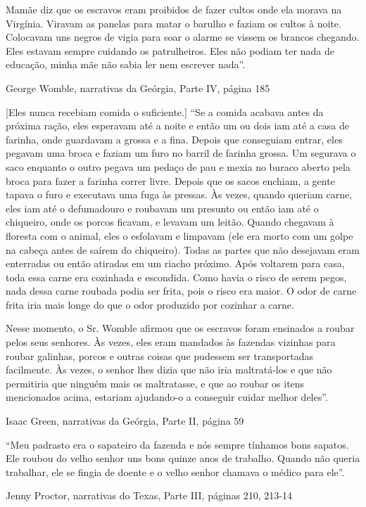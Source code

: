 Mamãe diz que os escravos eram proibidos de fazer cultos onde ela morava
na Virgínia. Viravam as panelas para matar o barulho e faziam os cultos
à noite. Colocavam uns negros de vigia para soar o alarme se vissem os
brancos chegando. Eles estavam sempre cuidando os patrulheiros. Eles não
podiam ter nada de educação, minha mãe não sabia ler nem escrever
nada''.

George Womble, narrativas da Geórgia, Parte IV, página 185

{[}Eles nunca recebiam comida o suficiente.{]} ``Se a comida acabava
antes da próxima ração, eles esperavam até a noite e então um ou dois
iam até a casa de farinha, onde guardavam a grossa e a fina. Depois que
conseguiam entrar, eles pegavam uma broca e faziam um furo no barril de
farinha grossa. Um segurava o saco enquanto o outro pegava um pedaço de
pau e mexia no buraco aberto pela broca para fazer a farinha correr
livre. Depois que os sacos enchiam, a gente tapava o furo e executava
uma fuga às pressas. Às vezes, quando queriam carne, eles iam até o
defumadouro e roubavam um presunto ou então iam até o chiqueiro, onde os
porcos ficavam, e levavam um leitão. Quando chegavam à floresta com o
animal, eles o esfolavam e limpavam (ele era morto com um golpe na
cabeça antes de saírem do chiqueiro). Todas as partes que não desejavam
eram enterradas ou então atiradas em um riacho próximo. Após voltarem
para casa, toda essa carne era cozinhada e escondida. Como havia o risco
de serem pegos, nada dessa carne roubada podia ser frita, pois o risco
era maior. O odor de carne frita iria mais longe do que o odor produzido
por cozinhar a carne.

Nesse momento, o Sr. Womble afirmou que os escravos foram ensinados a
roubar pelos seus senhores. Às vezes, eles eram mandados às fazendas
vizinhas para roubar galinhas, porcos e outras coisas que pudessem ser
transportadas facilmente. Às vezes, o senhor lhes dizia que não iria
maltratá-los e que não permitiria que ninguém mais os maltratasse, e que
ao roubar os itens mencionados acima, estariam ajudando-o a conseguir
cuidar melhor deles''.

Isaac Green, narrativas da Geórgia, Parte II, página 59

``Meu padrasto era o sapateiro da fazenda e nós sempre tínhamos bons
sapatos. Ele roubou do velho senhor uns bons quinze anos de trabalho.
Quando não queria trabalhar, ele se fingia de doente e o velho senhor
chamava o médico para ele''.

Jenny Proctor, narrativas do Texas, Parte III, páginas 210, 213-14

